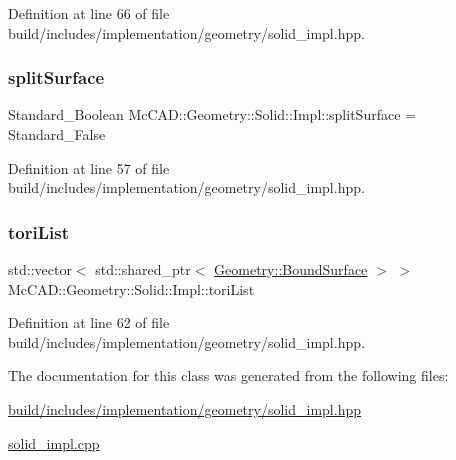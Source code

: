 Definition at line 66 of file build/includes/implementation/geometry/solid\+\_\+impl.\+hpp.

\mbox{\label{classMcCAD_1_1Geometry_1_1Solid_1_1Impl_a541bb95b820e30d0086d1ee1026acfcd}} 
\subsubsection{\texorpdfstring{split\+Surface}{splitSurface}}
{\footnotesize\ttfamily Standard\+\_\+\+Boolean Mc\+C\+A\+D\+::\+Geometry\+::\+Solid\+::\+Impl\+::split\+Surface = Standard\+\_\+\+False}



Definition at line 57 of file build/includes/implementation/geometry/solid\+\_\+impl.\+hpp.

\mbox{\label{classMcCAD_1_1Geometry_1_1Solid_1_1Impl_a32250ff3ecc553321430d595d92989c0}} 
\subsubsection{\texorpdfstring{tori\+List}{toriList}}
{\footnotesize\ttfamily std\+::vector$<$ std\+::shared\+\_\+ptr$<$ \hyperlink{classMcCAD_1_1Geometry_1_1BoundSurface}{Geometry\+::\+Bound\+Surface} $>$ $>$ Mc\+C\+A\+D\+::\+Geometry\+::\+Solid\+::\+Impl\+::tori\+List}



Definition at line 62 of file build/includes/implementation/geometry/solid\+\_\+impl.\+hpp.



The documentation for this class was generated from the following files\+:\begin{DoxyCompactItemize}
\item 
\hyperlink{build_2includes_2implementation_2geometry_2solid__impl_8hpp}{build/includes/implementation/geometry/solid\+\_\+impl.\+hpp}\item 
\hyperlink{solid__impl_8cpp}{solid\+\_\+impl.\+cpp}\end{DoxyCompactItemize}
